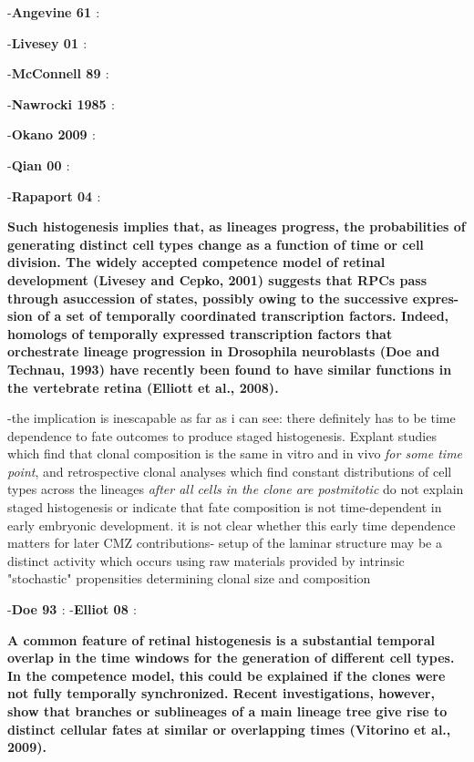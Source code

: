 \documentclass{ut-thesis}
\begin{document}
\bigskip

-\textbf{Angevine 61 \cite{Angevine1961}}: 

-\textbf{Livesey 01 \cite{Livesey2001}}: 

-\textbf{McConnell 89 \cite{McConnell1989}}: 

-\textbf{Nawrocki 1985 \cite{Nawrocki1985}}: 

-\textbf{Okano 2009 \cite{Okano2009}}: 

-\textbf{Qian 00 \cite{Qian2000}}: 

-\textbf{Rapaport 04 \cite{Rapaport2004}}: 

\bigskip

\textbf{
Such histogenesis implies that, as lineages progress, the probabilities of generating
distinct cell types change as a function of time or cell division.
The widely accepted competence model of retinal development
(Livesey and Cepko, 2001) suggests that RPCs pass through
asuccession of states, possibly owing to the successive expres-
sion of a set of temporally coordinated transcription factors.
Indeed, homologs of temporally expressed transcription factors
that orchestrate lineage progression in Drosophila neuroblasts
(Doe and Technau, 1993) have recently been found to have
similar functions in the vertebrate retina (Elliott et al., 2008).
}

\bigskip

-the implication is inescapable as far as i can see: there definitely has to be time dependence to fate outcomes to produce staged histogenesis. Explant studies which find that clonal composition is the same in vitro and in vivo \textit{for some time point}, and retrospective clonal analyses which find constant distributions of cell types across the lineages \textit{after all cells in the clone are postmitotic} do not explain staged histogenesis or indicate that fate composition is not time-dependent in early embryonic development. it is not clear whether this early time dependence matters for later CMZ contributions- setup of the laminar structure may be a distinct activity which occurs using raw materials provided by intrinsic "stochastic" propensities determining clonal size and composition

\bigskip

-\textbf{Doe 93 \cite{Doe1993}}: 
-\textbf{Elliot 08 \cite{Elliot2008}}:

\bigskip

\textbf{
A common feature of retinal histogenesis is a substantial temporal
overlap in the time windows for the generation of different cell
types. In the competence model, this could be explained if
the clones were not fully temporally synchronized.
 Recent investigations, however, show that branches or sublineages of
a main lineage tree give rise to distinct cellular fates at similar
or overlapping times (Vitorino et al., 2009).}
\end{document}
